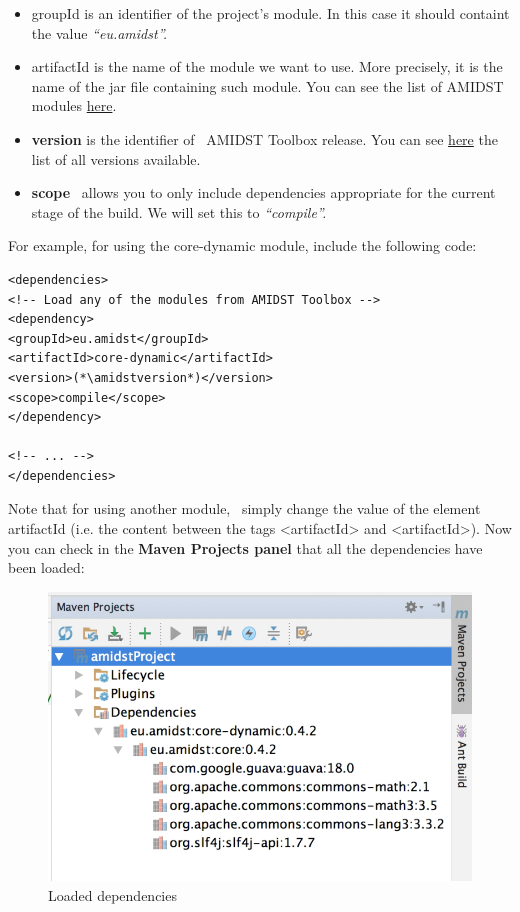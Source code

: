 \documentclass[10pt,a4paper]{article}
\begin{document}
\begin{itemize}
	\item
	{groupId} is an identifier of the project's module. In this case it
	should containt the value \emph{``eu.amidst''.}
	\item
	{artifactId }is the name of the module we want to use. More precisely,
	it is the name of the jar file containing such module. You can see the
	list of AMIDST modules
	\href{https://github.com/amidst/toolbox/tree/mvn-repo/eu/amidst}{here}.
	\item
	\textbf{version} is the identifier of~ AMIDST Toolbox release. You can
	see
	\href{mohttps://github.com/amidst/toolbox/blob/master/CHANGELOG.mddules\%20here}{here}
	the list of all versions available.
	\item
	\textbf{scope}~ allows you to only include dependencies appropriate
	for the current stage of the build. We will set this to
	\emph{``compile''.}
\end{itemize}

\noindent For example, for using the {core-dynamic }module, include the
following code:

\begin{lstlisting}
<dependencies>
<!-- Load any of the modules from AMIDST Toolbox -->
<dependency>
<groupId>eu.amidst</groupId>
<artifactId>core-dynamic</artifactId>
<version>(*\amidstversion*)</version>
<scope>compile</scope>
</dependency>

<!-- ... -->
</dependencies>        
\end{lstlisting}

Note that for using another module,~ simply change the value of the
element artifactId{ }(i.e. the content between the tags
\textless{}artifactId\textgreater{} and
\textless{}artifactId\textgreater{}). Now you can check in the \textbf{Maven Projects panel} that all the
dependencies have been loaded:


\begin{figure}[h!]
	\centering	
	\includegraphics[width=12cm]{img/use_amidst07.png}
	\caption{Loaded dependencies}
\end{figure}
\end{document}
